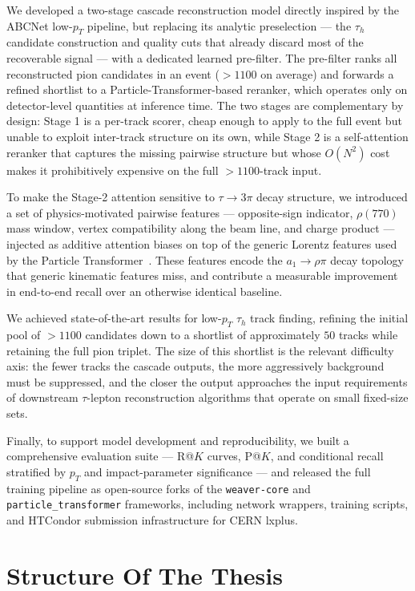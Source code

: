 We developed a two-stage cascade reconstruction model directly inspired by the ABCNet low-$p_T$ pipeline, but replacing its analytic preselection — the $\tau_h$ candidate construction and quality cuts that already discard most of the recoverable signal — with a dedicated learned pre-filter. The pre-filter ranks all reconstructed pion candidates in an event ($>1100$ on average) and forwards a refined shortlist to a Particle-Transformer-based reranker, which operates only on detector-level quantities at inference time. The two stages are complementary by design: Stage 1 is a per-track scorer, cheap enough to apply to the full event but unable to exploit inter-track structure on its own, while Stage 2 is a self-attention reranker that captures the missing pairwise structure but whose $O(N^2)$ cost makes it prohibitively expensive on the full $>1100$-track input.

To make the Stage-2 attention sensitive to $\tau \to 3\pi$ decay structure, we introduced a set of physics-motivated pairwise features — opposite-sign indicator, $\rho(770)$ mass window, vertex compatibility along the beam line, and charge product — injected as additive attention biases on top of the generic Lorentz features used by the Particle Transformer~\cite{particle_transformer_2022}. These features encode the $a_1 \to \rho \pi$ decay topology that generic kinematic features miss, and contribute a measurable improvement in end-to-end recall over an otherwise identical baseline.

We achieved state-of-the-art results for low-$p_T$ $\tau_h$ track finding, refining the initial pool of $>1100$ candidates down to a shortlist of approximately $50$ tracks while retaining the full pion triplet. The size of this shortlist is the relevant difficulty axis: the fewer tracks the cascade outputs, the more aggressively background must be suppressed, and the closer the output approaches the input requirements of downstream $\tau$-lepton reconstruction algorithms that operate on small fixed-size sets.

Finally, to support model development and reproducibility, we built a comprehensive evaluation suite — R@$K$ curves, P@$K$, and conditional recall stratified by $p_T$ and impact-parameter significance — and released the full training pipeline as open-source forks of the \texttt{weaver-core} and \texttt{particle\_transformer} frameworks, including network wrappers, training scripts, and HTCondor submission infrastructure for CERN lxplus.

\section{Structure Of The Thesis}

